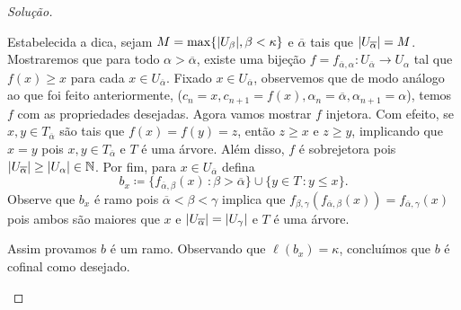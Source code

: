\documentclass[a4paper]{article}
\begin{document}
\begin{proof}[Solução]
\begin{enumerate}[(i)]
      Estabelecida a dica, sejam \(M=\max\{\vert U_\beta \vert,\beta<\kappa\}\) e
      \(\overline{\alpha}\) tais que \(\vert U_{\overline{\alpha}} \vert=M\). Mostraremos que para
      todo \(\alpha>\overline{\alpha}\), existe uma bijeção
      \(f=f_{\overline{\alpha},\alpha}\colon U_{\overline{\alpha}}\to
      U_\alpha\)  tal que \(f(x)\geq x\) para cada \(x\in
      U_{\overline{\alpha}}\). Fixado \(x\in U_{\overline{\alpha}}\),
      observemos que de modo análogo ao que foi
      feito anteriormente,
      \mbox{(\(c_n=x, c_{n+1}=f(x),\alpha_n=\overline{\alpha}, \alpha_{n+1}=\alpha\))}, temos \(f\)
      com as propriedades desejadas. Agora vamos mostrar \(f\) injetora. Com
      efeito, se \(x,y\in T_{\overline{\alpha}}\) são tais que  
      \(f(x)=f(y)=z\), então \(z\geq x\) e \(z\geq
      y\), implicando que \(x=y\) pois \(x,y\in T_{\overline{\alpha}}\) e \(T\) é uma
      árvore. Além disso, \(f\) é sobrejetora pois
      \(\vert U_{\overline{\alpha}} \vert\geq\vert U_\alpha \vert\in\mathbb{N}\).
      Por fim, para \(x\in U_{\overline{\alpha}}\) defina \[b_x\coloneqq
      \{f_{\overline{\alpha},\beta}(x)\,\colon\beta>\overline{\alpha}\}\cup\{y\in T\,\colon y\leq x\}.\]
      Observe que \(b_x\) é ramo pois \(\overline{\alpha}<\beta<\gamma\) implica que
      \(f_{\beta,\gamma}(f_{\overline{\alpha},\beta}(x))=f_{\overline{\alpha},\gamma}(x)\)
      pois ambos são  maiores que \(x\) e
      \(\vert U_{\overline{\alpha}} \vert=\vert U_\gamma \vert\) e  \(T\) é uma árvore.
      
      Assim provamos \(b\) é um ramo. Observando que \(\ell(b_x)=\kappa\),
      concluímos que \(b\) é cofinal como desejado.\qedhere
    \end{enumerate}
    \end{proof}
    
\end{document}
